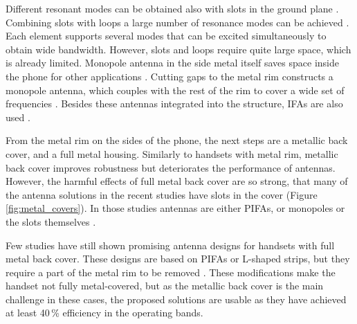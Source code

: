 Different resonant modes can be obtained also with slots in the ground plane \cite{yuan_slot}. Combining slots with loops a large number of resonance modes can be achieved \cite{hsu_compact}. Each element supports several modes that can be excited simultaneously to obtain wide bandwidth. However, slots and loops require quite large space, which is already limited. Monopole antenna in the side metal itself saves space inside the phone for other applications \cite{lee_monopole, valkonen_multifeed}. Cutting gaps to the metal rim constructs a monopole antenna, which couples with the rest of the rim to cover a wide set of frequencies \cite{chen_metal_frame}. Besides these antennas integrated into the structure, IFAs are also used \cite{hepta_ifa}. %

From the metal rim on the sides of the phone, the next steps are a metallic back cover, and a full metal housing. Similarly to handsets with metal rim, metallic back cover improves robustness but deteriorates the performance of antennas. However, the harmful effects of full metal back cover are so strong, that many of the antenna solutions in the recent studies have slots in the cover (Figure \ref{fig:metal_covers}). In those studies antennas are either PIFAs, or monopoles or the slots themselves \cite{wu_pier, son_wideband_mimo, wu_tunable, zhong_pier}. 

Few studies have still shown promising antenna designs for handsets with full metal back cover. These designs are based on PIFAs or L-shaped strips, but they require a part of the metal rim to be removed \cite{chen_compact_lte, wu_pier}. These modifications make the handset not fully metal-covered, but as the metallic back cover is the main challenge in these cases, the proposed solutions are usable as they have achieved at least 40\,\% efficiency in the operating bands. %

